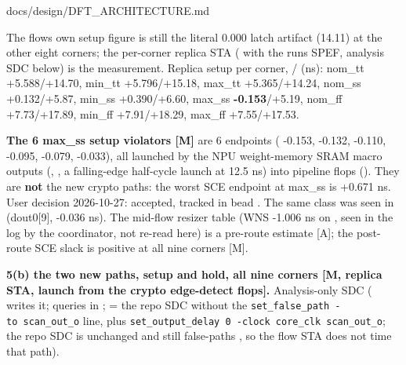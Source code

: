 \begin{relocated}{docs/design/DFT_ARCHITECTURE.md}
{}

The flow\textquotesingle s own setup figure is still the literal 0.000
latch artifact (14.11) at the other eight corners; the per-corner
replica STA ( with the
run\textquotesingle s SPEF, analysis SDC below) is the measurement.
Replica setup per corner,  /  (ns): nom\_tt
+5.588/\allowbreak{}+14.70, min\_tt +5.796/\allowbreak{}+15.18, max\_tt
+5.365/\allowbreak{}+14.24, nom\_ss +0.132/\allowbreak{}+5.87, min\_ss
+0.390/\allowbreak{}+6.60, max\_ss \textbf{-0.153}/+5.19, nom\_ff
+7.73/\allowbreak{}+17.89, min\_ff +7.91/\allowbreak{}+18.29, max\_ff
+7.55/\allowbreak{}+17.53.

\textbf{The 6 max\_ss setup violators {[}M{]}} are 6 endpoints
( -0.153,  -0.132, 
-0.110,  -0.095,  -0.079,
 -0.033), all launched by the NPU weight-memory SRAM
macro outputs (,
\code{[8]}, a falling-edge half-cycle launch at 12.5 ns) into
 pipeline flops (). They are
\textbf{not} the new crypto paths: the worst SCE endpoint at max\_ss is
+0.671 ns. User decision 2026-10-27: accepted, tracked in bead
. The same class was seen in 
(dout0{[}9{]}, -0.036 ns). The mid-flow resizer table (WNS -1.006 ns on
, seen in the log by the coordinator, not re-read
here) is a pre-route estimate {[}A{]}; the post-route SCE slack is
positive at all nine corners {[}M{]}.

\textbf{5(b) the two new paths, setup and hold, all nine corners {[}M,
replica STA, launch  from the crypto edge-detect
flops{]}.} Analysis-only SDC (
writes it; queries in
; = the repo SDC
without the
\texttt{set\_\allowbreak{}false\_\allowbreak{}path\ -\allowbreak{}to\ scan\_\allowbreak{}out\_\allowbreak{}o}
line, plus
\texttt{set\_\allowbreak{}output\_\allowbreak{}delay\ 0\ -\allowbreak{}clock\ core\_\allowbreak{}clk\ scan\_\allowbreak{}out\_\allowbreak{}o};
the repo SDC is unchanged and still false-paths , so
the flow STA does not time that path).

{\small\setlength{\tabcolsep}{4pt}

}
\end{relocated}
